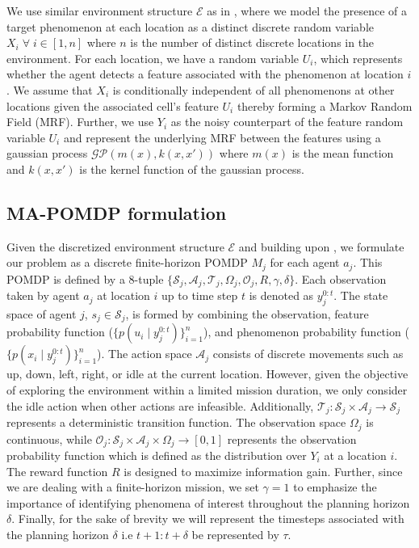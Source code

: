 \documentclass[letterpaper, 10 pt, conference]{IEEEConference}
\begin{document}
We use similar environment structure $\mathcal{E}$ as in \cite{ayton2017}, where we model the presence of a target phenomenon at each location as a distinct discrete random variable $X_i \; \forall \; i \in [1, n]$ where $n$ is the number of distinct discrete locations in the environment. For each location, we have a random variable $U_i$, which represents whether the agent detects a feature associated with the phenomenon at location $i$. We assume that $X_i$ is conditionally independent of all phenomenons at other locations given the associated cell's feature $U_i$ thereby forming a Markov Random Field (MRF). Further, we use $Y_i$ as the noisy counterpart of the feature random variable $U_i$ and represent the underlying MRF between the features using a gaussian process $\mathcal{GP}(m(x), k(x,x'))$ where $m(x)$ is the mean function and $k(x, x')$ is the kernel function of the gaussian process. 

\subsection{MA-POMDP formulation}

Given the discretized environment structure $\mathcal{E}$ and building upon \cite{ayton2017}, we formulate our problem as a discrete finite-horizon POMDP $M_j$ for each agent $a_j$. This POMDP is defined by a 8-tuple $\{\mathcal{S}_j, \mathcal{A}_j, \mathcal{T}_j, \Omega_j, \mathcal{O}_j, R, \gamma, \delta\}$. Each observation taken by agent $a_j$ at location $i$ up to time step $t$ is denoted as $y_j^{0:t}$. The state space of agent $j$, $s_j \in \mathcal{S}_j$, is formed by combining the observation, feature probability function ($\lbrace p(u_i \mid y_j^{0:t}) \rbrace_{i=1}^{n}$), and phenomenon probability function ($\lbrace p(x_i \mid y_j^{0:t}) \rbrace_{i=1}^{n}$). The action space $\mathcal{A}_j$ consists of discrete movements such as up, down, left, right, or idle at the current location. However, given the objective of exploring the environment within a limited mission duration, we only consider the idle action when other actions are infeasible. Additionally, $\mathcal{T}_j: \mathcal{S}_j \times \mathcal{A}_j \rightarrow \mathcal{S}_j$ represents a deterministic transition function. The observation space $\Omega_j$ is continuous, while $\mathcal{O}_j : \mathcal{S}_j \times \mathcal{A}_j \times \Omega_j \rightarrow [0, 1]$ represents the observation probability function which is defined as the distribution over $Y_i$ at a location $i$. The reward function $R$ is designed to maximize information gain. Further, since we are dealing with a finite-horizon mission, we set $\gamma = 1$ to emphasize the importance of identifying phenomena of interest throughout the planning horizon $\delta$. Finally, for the sake of brevity we will represent the timesteps associated with the planning horizon $\delta$ i.e $t+1:t+\delta$ be represented by $\tau$.
\end{document}
